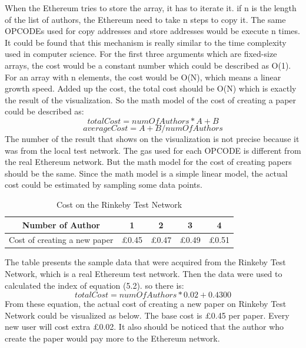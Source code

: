 \documentclass[openany,12pt]{ecsthesis}      %
\begin{document}
When the Ethereum tries to store the array, it has to iterate it. if n is the length of the list of authors,
the Ethereum need to take n steps to copy it. The same OPCODEs used for copy addresses and store addresses would be execute n times. 
It could be found that this mechanism is really similar to the time complexity used in computer science. 
For the first three arguments which are fixed-size arrays, the cost would be a constant number which could be described as O(1).
For an array with n elements, the cost would be O(N), which means a linear growth speed. 
Added up the cost, the total cost should be O(N) which is exactly the result of the visualization.
So the math model of the cost of creating a paper could be described as:
\begin{equation}
  totalCost = numOfAuthors * A + B
\end{equation}
\begin{equation}
  averageCost = A + B/numOfAuthors
\end{equation}
The number of the result that shows on the visualization is not precise 
because it was from the local test network. 
The gas used for each OPCODE is different from the real Ethereum network. 
But the math model for the cost of creating papers should be the same. 
Since the math model is a simple linear model, 
the actual cost could be estimated by sampling some data points.
\begin{table}[H] 
  \centering
  \caption{Cost on the Rinkeby Test Network}
\begin{tabular}{|c|c|c|c|c|}
  \hline Number of Author & 1 & 2&3&4  \\
  \hline Cost of creating a new paper &£0.45&£0.47&£0.49&£0.51\\
  \hline
 \end{tabular}
\end{table}
The table presents the sample data that were acquired from the Rinkeby Test Network, which is a real Ethereum test network.
Then the data were used to calculated the index of equation (5.2). 
so there is:
\begin{equation}
  totalCost = numOfAuthors * 0.02 + 0.4300
\end{equation}
From these equation, the actual cost of creating a new paper on Rinkeby Test Network could be visualized as below.
The base cost is £0.45 per paper. 
Every new user will cost extra £0.02. 
It also should be noticed that the author who create the paper would pay more to the Ethereum network.
\end{document}
